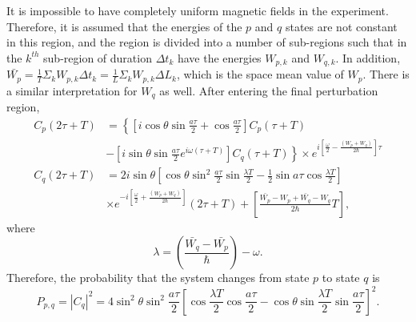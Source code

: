 It is impossible to have completely uniform magnetic fields in the
experiment. Therefore, it is assumed that the energies of the $p$ and
$q$ states are not constant in this region, and the region is divided
into a number of sub-regions such that in the $k^{th}$ sub-region of
duration $\Delta t_k$ have the energies $W_{p,k}$ and $W_{q,k}$. In
addition,
$\bar{W_p}=\frac{1}{T}\Sigma_k W_{p,k}\Delta t_k=\frac{1}{L}\Sigma_k
W_{p,k} \Delta L_k$, which is the space mean value of $W_p$. There is
a similar interpretation for $W_q$ as well. After entering the final
perturbation region,
\begin{align}
  C_p(2\tau+T) &=\left\lbrace \left[i \cos \theta \sin \frac{a\tau}{2}+\cos \frac{a\tau}{2}\right]C_p(\tau+T) \right. \\ \nonumber
                 &-
 \left. \left[i \sin \theta \sin \frac{a\tau}{2} e^{i \omega (\tau+T)}\right]C_q(\tau+T)\right\rbrace \times
  e^{i\left[\frac{\omega}{2}-\frac{(W_p+W_q)}{2\hbar}\right]\tau}\\ \nonumber
     C_q(2\tau+T)&= 2i\sin \theta \left[ \cos \theta \sin^2 \frac{a\tau}{2}\sin \frac{\lambda T}{2} -\frac{1}{2}\sin a\tau \cos \frac{\lambda T}{2} \right] \nonumber \\ &\times e^{-i \left[\frac{\omega}{2} + \frac{(W_p+W_q)}{2\hbar}\right]}(2\tau+T) +
                                                                                                                                                                           \left[ \frac{\bar{W_p}-W_p+\bar{W_q}-W_q}{2\hbar} 
                                                                                                                                                                           T\right] ,
\end{align} 
where
\begin{equation}
\lambda= \left( \frac{\bar{W_q}-\bar{W_p}}{\hbar} \right)- \omega .
\end{equation}
Therefore, the probability that the system changes from state $p$ to
state $q$ is
%
\begin{equation}
P_{p,q}=|C_q|^2 =4 \sin ^2 \theta \sin ^2 \frac{a\tau}{2} \left[
\cos \frac{\lambda T}{2} \cos \frac{a\tau}{2} -
\cos \theta \sin \frac{\lambda T}{2} \sin \frac{a\tau}{2} \right] ^2 .
\end{equation}
